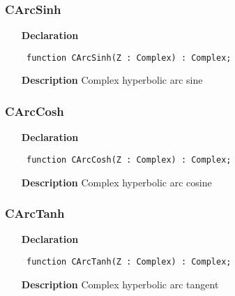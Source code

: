 \documentclass[12pt,a4paper,oneside]{report}
\newcommand{\declarationitem}[1]{\textbf{#1}}
\newcommand{\descriptiontitle}[1]{\textbf{#1}}
\newcommand{\code}[1]{\texttt{#1}}
\begin{document}
\subsubsection{CArcSinh}
\label{ucomplex-CArcSinh}
\begin{itemize}\item[\declarationitem{Declaration}\hfill]
\begin{flushleft}
\code{
function CArcSinh(Z : Complex) : Complex;}

\end{flushleft}

\par
\item[\descriptiontitle{Description}]
Complex hyperbolic arc sine

\end{itemize}
\subsubsection{CArcCosh}
\label{ucomplex-CArcCosh}
\begin{itemize}\item[\declarationitem{Declaration}\hfill]
\begin{flushleft}
\code{
function CArcCosh(Z : Complex) : Complex;}

\end{flushleft}

\par
\item[\descriptiontitle{Description}]
Complex hyperbolic arc cosine

\end{itemize}
\subsubsection{CArcTanh}
\label{ucomplex-CArcTanh}
\begin{itemize}\item[\declarationitem{Declaration}\hfill]
\begin{flushleft}
\code{
function CArcTanh(Z : Complex) : Complex;}

\end{flushleft}

\par
\item[\descriptiontitle{Description}]
Complex hyperbolic arc tangent

\end{itemize}
\end{document}
